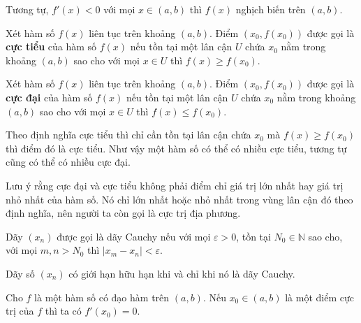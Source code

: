\documentclass{mynotes}
\newcommand{\NN}{\mathbb{N}}
\begin{document}
Tương tự, $f'(x) < 0$ với mọi $x \in (a, b)$ thì $f(x)$ nghịch biến trên
$(a, b)$.

\begin{definition}
    Xét hàm số $f(x)$ liên tục trên khoảng $(a, b)$. Điểm $(x_0, f(x_0))$ được
    gọi là \textbf{cực tiểu} của hàm số $f(x)$ nếu tồn tại một lân cận $U$
    chứa $x_0$ nằm trong khoảng $(a, b)$ sao cho với mọi $x \in U$ thì $f(x) \geqslant f(x_0)$.
\end{definition}

\begin{definition}
    Xét hàm số $f(x)$ liên tục trên khoảng $(a, b)$. Điểm $(x_0, f(x_0))$ được
    gọi là \textbf{cực đại} của hàm số $f(x)$ nếu tồn tại một lân cận $U$
    chứa $x_0$ nằm trong khoảng $(a, b)$ sao cho với mọi $x \in U$ thì $f(x) \leqslant f(x_0)$.
\end{definition}

Theo định nghĩa cực tiểu thì chỉ cần tồn tại lân cận chứa $x_0$
mà $f(x) \geqslant f(x_0)$ thì điểm đó là cực tiểu. Như vậy một hàm số có 
thể có nhiều cực tiểu, tương tự cũng có thể có nhiều cực đại.

Lưu ý rằng cực đại và cực tiểu không phải điểm chỉ giá trị lớn nhất
hay giá trị nhỏ nhất của hàm số. Nó chỉ lớn nhất hoặc nhỏ nhất trong
vùng lân cận đó theo định nghĩa, nên người ta còn gọi là cực trị địa phương.


\begin{definition}
    Dãy $(x_n)$ được gọi là dãy Cauchy nếu với mọi $\varepsilon > 0$, tồn tại $N_0 \in \NN$ sao cho, với mọi $m, n > N_0$ thì $\lvert x_m - x_n \rvert < \varepsilon$.
\end{definition}

\begin{theorem}
    Dãy số $(x_n)$ có giới hạn hữu hạn khi và chỉ khi nó là dãy Cauchy.
\end{theorem}

\begin{theorem}[Bổ đề Fermat]
    Cho $f$ là một hàm số có đạo hàm trên $(a, b)$. Nếu $x_0 \in (a, b)$ là một điểm cực trị của $f$ thì ta có $f'(x_0) = 0$.
\end{theorem}
\end{document}
